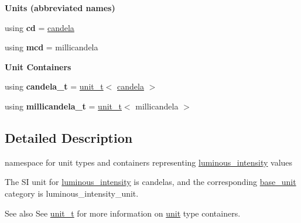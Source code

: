 \begin{Indent}{\bf Units (abbreviated names)}\par
\begin{DoxyCompactItemize}
\item 
\hypertarget{namespaceunits_1_1luminous__intensity_a52cd06200298f20cef3e03cf9f42d2f9}{}using {\bfseries cd} = \hyperlink{structunits_1_1unit}{candela}\label{namespaceunits_1_1luminous__intensity_a52cd06200298f20cef3e03cf9f42d2f9}

\item 
\hypertarget{namespaceunits_1_1luminous__intensity_a8a9dbc85eebb8841f74ea8a5a330d401}{}using {\bfseries mcd} = millicandela\label{namespaceunits_1_1luminous__intensity_a8a9dbc85eebb8841f74ea8a5a330d401}

\end{DoxyCompactItemize}
\end{Indent}
\begin{Indent}{\bf Unit Containers}\par
{\em \label{namespaceunits_1_1luminous__intensity_luminousIntensityContainers}%
\hypertarget{namespaceunits_1_1luminous__intensity_luminousIntensityContainers}{}%
}\begin{DoxyCompactItemize}
\item 
\hypertarget{namespaceunits_1_1luminous__intensity_a65770148f3a62ab814beec03ad1df0c2}{}using {\bfseries candela\+\_\+t} = \hyperlink{classunits_1_1unit__t}{unit\+\_\+t}$<$ \hyperlink{structunits_1_1unit}{candela} $>$\label{namespaceunits_1_1luminous__intensity_a65770148f3a62ab814beec03ad1df0c2}

\item 
\hypertarget{namespaceunits_1_1luminous__intensity_a9fd6282e610929443d537ed41bf42487}{}using {\bfseries millicandela\+\_\+t} = \hyperlink{classunits_1_1unit__t}{unit\+\_\+t}$<$ millicandela $>$\label{namespaceunits_1_1luminous__intensity_a9fd6282e610929443d537ed41bf42487}

\end{DoxyCompactItemize}
\end{Indent}


\subsection{Detailed Description}
namespace for unit types and containers representing \hyperlink{namespaceunits_1_1luminous__intensity}{luminous\+\_\+intensity} values 

The S\+I unit for \hyperlink{namespaceunits_1_1luminous__intensity}{luminous\+\_\+intensity} is {\ttfamily candelas}, and the corresponding {\ttfamily \hyperlink{structunits_1_1base__unit}{base\+\_\+unit}} category is {\ttfamily luminous\+\_\+intensity\+\_\+unit}. \begin{DoxySeeAlso}{See also}
See \hyperlink{classunits_1_1unit__t}{unit\+\_\+t} for more information on \hyperlink{structunits_1_1unit}{unit} type containers. 
\end{DoxySeeAlso}

